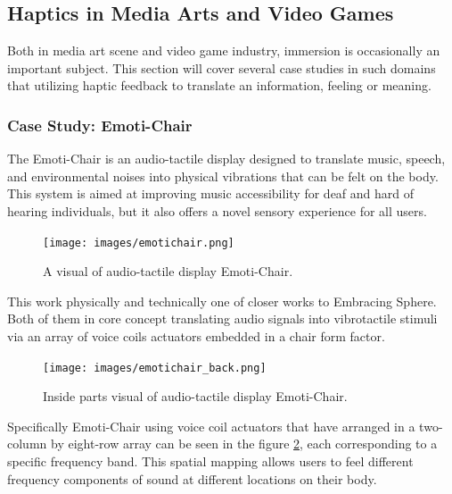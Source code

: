         \subsection{Haptics in Media Arts and Video Games}
            Both in media art scene and video game industry, immersion is occasionally an important subject. This section will cover several case studies in such domains that utilizing haptic feedback to translate an information, feeling or meaning.\par

            \subsubsection{Case Study: Emoti-Chair}
                The Emoti-Chair is an audio-tactile display designed to translate music, speech, and environmental noises into physical vibrations that can be felt on the body. This system is aimed at improving music accessibility for deaf and hard of hearing individuals, but it also offers a novel sensory experience for all users\cite{Emoti-Chair}.\par

                \begin{figure}[H]
                    \centering
                    \texttt{[image: images/emotichair.png]}
                    \caption{A visual of audio-tactile display Emoti-Chair.}
                    \label{fig:EMOTICHAIR}
                \end{figure}

                This work physically and technically one of closer works to Embracing Sphere. Both of them in core concept translating audio signals into vibrotactile stimuli via an array of voice coils actuators embedded in a chair form factor.\par

                \begin{figure}[H]
                    \centering
                    \texttt{[image: images/emotichair\_back.png]}
                    \caption{Inside parts visual of audio-tactile display Emoti-Chair.}
                    \label{fig:EMOTICHAIR_BACK}
                \end{figure}

                Specifically Emoti-Chair using voice coil actuators that have arranged in a two-column by eight-row array can be seen in the figure \ref{fig:EMOTICHAIR_BACK}, each corresponding to a specific frequency band. This spatial mapping allows users to feel different frequency components of sound at different locations on their body.\par

